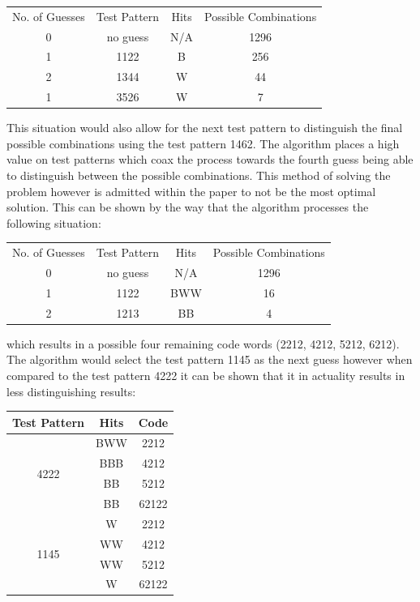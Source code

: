 \documentclass[11pt]{article}  %
\theoremstyle{definition}
\theoremstyle{remark}
\begin{document}
{
\centering
\begin{tabular}{cccc}
No. of Guesses & Test Pattern &  Hits  & Possible Combinations \\
0 & no guess & N/A & 1296 \\
1 & 1122 &  B  &  256 \\
2 & 1344 &  W  &  44 \\
1 & 3526 &  W  &  7 \\
\end {tabular} \par 
}

This situation would also allow for the next test pattern to distinguish the final possible combinations using the test pattern 1462. The algorithm places a high value on test patterns which coax the process towards the fourth guess being able to distinguish between the possible combinations. This method of solving the problem however is admitted within the paper to not be the most optimal solution. This can be shown by the way that the algorithm processes the following situation:
\\

{
\centering
\begin{tabular}{cccc}
No. of Guesses & Test Pattern &  Hits  & Possible Combinations \\
0 & no guess & N/A & 1296 \\
1 & 1122 &  BWW  &  16 \\
2 & 1213 &  BB  &  4 \\
\end {tabular} \par 
} 

which results in a possible four remaining code words (2212, 4212, 5212, 6212). The algorithm would select the test pattern 1145 as the next guess however when compared to the test pattern 4222 it can be shown that it in actuality results in less distinguishing results:
\\

{
\centering
\begin{tabular}{ccc}
Test Pattern          & Hits & Code  \\ \hline
\multirow{4}{*}{4222} & BWW  & 2212  \\
                      & BBB  & 4212  \\
                      & BB   & 5212  \\
                      & BB   & 62122 \\ \hline
\multirow{4}{*}{1145} & W    & 2212  \\
                      & WW   & 4212  \\
                      & WW   & 5212  \\
                      & W    & 62122
\end{tabular} \par
} 
\end{document}
